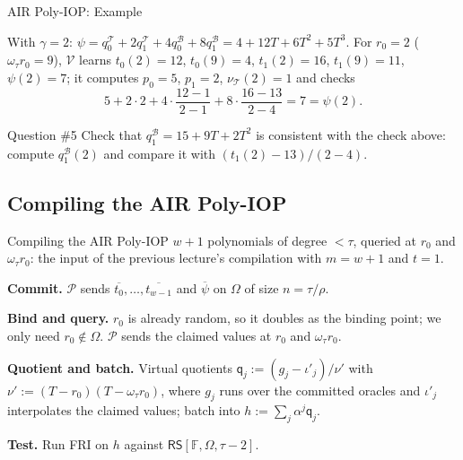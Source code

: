 \documentclass{zkdl-presentation-template}
\begin{document}
    \begin{frame}{AIR Poly-IOP: Example}
        \begin{example}
            With $\gamma = 2$: $\psi = q^{\mathcal{T}}_0 + 2 q^{\mathcal{T}}_1 + 4 q^{\mathcal{B}}_0 + 8 q^{\mathcal{B}}_1 = 4 + 12T + 6T^2 + 5T^3$. For $r_0 = 2$ ($\omega_\tau r_0 = 9$), $\mathcal{V}$ learns $t_0(2) = 12$, $t_0(9) = 4$, $t_1(2) = 16$, $t_1(9) = 11$, $\psi(2) = 7$; it computes $p_0 = 5$, $p_1 = 2$, $\nu_{\mathcal{T}}(2) = 1$ and checks
            \begin{equation*}
                5 + 2 \cdot 2 + 4 \cdot \frac{12 - 1}{2 - 1} + 8 \cdot \frac{16 - 13}{2 - 4} = 7 = \psi(2).
            \end{equation*}
        \end{example}
        \pause

        \begin{questionblock}{Question \#5}
            Check that $q^{\mathcal{B}}_1 = 15 + 9T + 2T^2$ is consistent with the check above: compute $q^{\mathcal{B}}_1(2)$ and compare it with $(t_1(2) - 13)/(2 - 4)$.
        \end{questionblock}
    \end{frame}

    \subsection{Compiling the AIR Poly-IOP}

    \begin{frame}{Compiling the AIR Poly-IOP}
        $w + 1$ polynomials of degree $< \tau$, queried at $r_0$ and $\omega_\tau r_0$: the input of the previous lecture's compilation with $m = w + 1$ and $t = 1$.
        \begin{algoen}
            \item<2-> \textbf{Commit.} $\mathcal{P}$ sends $\overline{t_0}, \ldots, \overline{t_{w-1}}$ and $\overline{\psi}$ on $\Omega$ of size $n = \tau / \rho$.
            \item<3-> \textbf{Bind and query.} $r_0$ is already random, so it doubles as the binding point; we only need $r_0 \notin \Omega$. $\mathcal{P}$ sends the claimed values at $r_0$ and $\omega_\tau r_0$.
            \item<4-> \textbf{Quotient and batch.} Virtual quotients $\mathsf{q}_j := (g_j - \iota'_j)/\nu'$ with $\nu' := (T - r_0)(T - \omega_\tau r_0)$, where $g_j$ runs over the committed oracles and $\iota'_j$ interpolates the claimed values; batch into $h := \sum_j \alpha^j \mathsf{q}_j$.
            \item<5-> \textbf{Test.} Run FRI on $h$ against $\mathsf{RS}[\mathbb{F}, \Omega, \tau - 2]$.
        \end{algoen}
    \end{frame}
\end{document}
